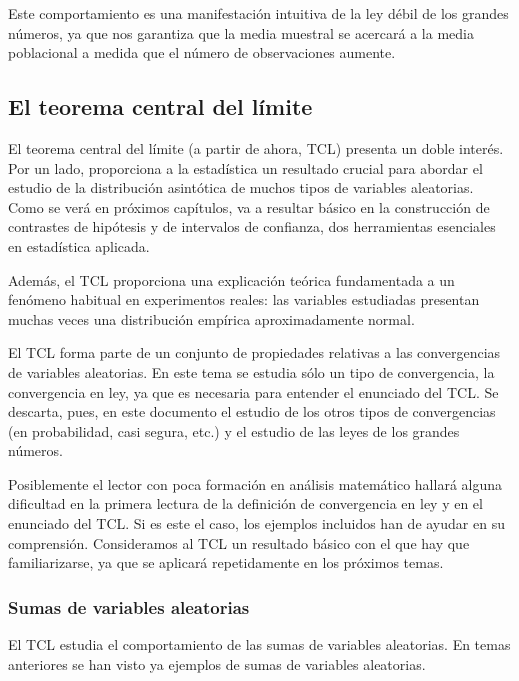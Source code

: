 \documentclass[
]{article}
\begin{document}
Este comportamiento es una manifestación intuitiva de la ley débil de los grandes números, ya que nos garantiza que la media muestral se acercará a la media poblacional a medida que el número de observaciones aumente.

\subsection{El teorema central del límite}\label{el-teorema-central-del-luxedmite}

El teorema central del límite (a partir de ahora, TCL) presenta un doble interés. Por un lado, proporciona a la estadística un resultado crucial para abordar el estudio de la distribución asintótica de muchos tipos de variables aleatorias. Como se verá en próximos capítulos, va a resultar básico en la construcción de contrastes de hipótesis y de intervalos de confianza, dos herramientas esenciales en estadística aplicada.

Además, el TCL proporciona una explicación teórica fundamentada a un fenómeno habitual en experimentos reales: las variables estudiadas presentan muchas veces una distribución empírica aproximadamente normal.

El TCL forma parte de un conjunto de propiedades relativas a las convergencias de variables aleatorias. En este tema se estudia sólo un tipo de convergencia, la convergencia en ley, ya que es necesaria para entender el enunciado del TCL. Se descarta, pues, en este documento el estudio de los otros tipos de convergencias (en probabilidad, casi segura, etc.) y el estudio de las leyes de los grandes números.

Posiblemente el lector con poca formación en análisis matemático hallará alguna dificultad en la primera lectura de la definición de convergencia en ley y en el enunciado del TCL. Si es este el caso, los ejemplos incluidos han de ayudar en su comprensión. Consideramos al TCL un resultado básico con el que hay que familiarizarse, ya que se aplicará repetidamente en los próximos temas.

\subsubsection{Sumas de variables aleatorias}\label{sumas-de-variables-aleatorias}

El TCL estudia el comportamiento de las sumas de variables aleatorias. En temas anteriores se han visto ya ejemplos de sumas de variables aleatorias.
\end{document}
